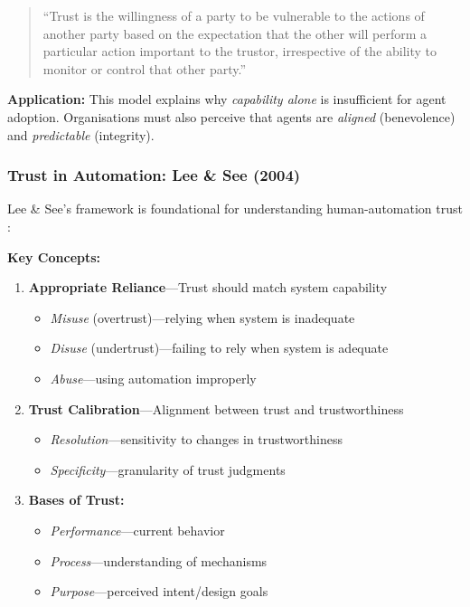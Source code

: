 \begin{quote}
``Trust is the willingness of a party to be vulnerable to the actions of another party based on the expectation that the other will perform a particular action important to the trustor, irrespective of the ability to monitor or control that other party.'' \citep{mayer1995}
\end{quote}

\textbf{Application:} This model explains why \textit{capability alone} is insufficient for agent adoption. Organisations must also perceive that agents are \textit{aligned} (benevolence) and \textit{predictable} (integrity).

\subsubsection{Trust in Automation: Lee \& See (2004)}

Lee \& See's framework is foundational for understanding human-automation trust \citep{lee2004}:

\textbf{Key Concepts:}

\begin{enumerate}
    \item \textbf{Appropriate Reliance}---Trust should match system capability
    \begin{itemize}
        \item \textit{Misuse} (overtrust)---relying when system is inadequate
        \item \textit{Disuse} (undertrust)---failing to rely when system is adequate
        \item \textit{Abuse}---using automation improperly
    \end{itemize}

    \item \textbf{Trust Calibration}---Alignment between trust and trustworthiness
    \begin{itemize}
        \item \textit{Resolution}---sensitivity to changes in trustworthiness
        \item \textit{Specificity}---granularity of trust judgments
    \end{itemize}

    \item \textbf{Bases of Trust:}
    \begin{itemize}
        \item \textit{Performance}---current behavior
        \item \textit{Process}---understanding of mechanisms
        \item \textit{Purpose}---perceived intent/design goals
    \end{itemize}
\end{enumerate}

